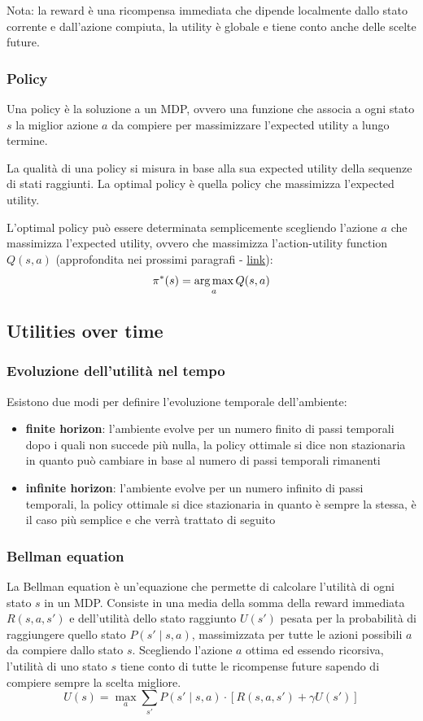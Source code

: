 Nota: la reward è una ricompensa immediata che dipende localmente dallo stato corrente e dall'azione compiuta, la utility
è globale e tiene conto anche delle scelte future.

\subsubsection*{Policy}
Una policy è la soluzione a un MDP, ovvero una funzione che associa a ogni stato \(s\) la miglior azione \(a\) da compiere
per massimizzare l'expected utility a lungo termine.

La qualità di una policy si misura in base alla sua expected utility della sequenze di stati raggiunti. La optimal policy è
quella policy che massimizza l'expected utility.

L'optimal policy può essere determinata semplicemente scegliendo l'azione \(a\) che massimizza l'expected utility, ovvero
che massimizza l'action-utility function \(Q(s,a)\) (approfondita nei prossimi paragrafi - \hyperlink{q_function}{link}):
\[\pi^*(s) = \operatorname*{arg\,max}_a Q(s,a)\]

\newpage

\subsection{Utilities over time}
\subsubsection*{Evoluzione dell'utilità nel tempo}
Esistono due modi per definire l'evoluzione temporale dell'ambiente:
\begin{itemize}
	\item \textbf{finite horizon}: l'ambiente evolve per un numero finito di passi temporali dopo i quali non succede più nulla,
	la policy ottimale si dice non stazionaria in quanto può cambiare in base al numero di passi temporali rimanenti 
	\item \textbf{infinite horizon}: l'ambiente evolve per un numero infinito di passi temporali, la policy ottimale si dice
	stazionaria in quanto è sempre la stessa, è il caso più semplice e che verrà trattato di seguito
\end{itemize}

\subsubsection*{Bellman equation}
La Bellman equation è un'equazione che permette di calcolare l'utilità di ogni stato \(s\) in un MDP. Consiste in una media
della somma della reward immediata \(R(s,a,s')\) e dell'utilità dello stato raggiunto \(U(s')\) pesata per la probabilità di
raggiungere quello stato \(P(s' \mid s, a)\), massimizzata per tutte le azioni possibili \(a\) da compiere dallo stato \(s\).
Scegliendo l'azione \(a\) ottima ed essendo ricorsiva, l'utilità di uno stato \(s\) tiene conto di tutte le ricompense future
sapendo di compiere sempre la scelta migliore.
\[U(s) = \max_a \sum_{s'} P(s' \mid s, a) \cdot [R(s,a,s') + \gamma U(s')]\]

